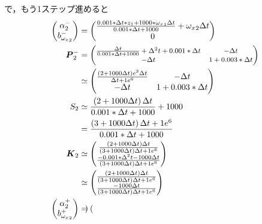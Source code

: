 で，もう1ステップ進めると
\begin{align}
  \begin{pmatrix}
    \alpha_{2}^{-}\\
    b_{{\omega_x}_{2}}^{-}
  \end{pmatrix} &=
  \begin{pmatrix}
    \frac{0.001 * \Delta t * z_{1} + 1000 * {\omega_x}_{1} \Delta t}{0.001 * \Delta t + 1000} + {\omega_x}_2 \Delta t\\
    0
  \end{pmatrix}\\
  \boldsymbol{P}_{2}^{-} &=
  {\footnotesize
    \begin{pmatrix}
      \frac{\Delta t}{0.001 * \Delta t + 1000} + \Delta^2 t + 0.001 * \Delta t & - \Delta t\\
      - \Delta t & 1 + 0.003 * \Delta t
    \end{pmatrix}}\\
  &\simeq
  \begin{pmatrix}
    \frac{\left(2 + 1000 \Delta t\right) e^{3} \Delta t}{\Delta t + 1e^{6}} & - \Delta t\\
    - \Delta t & 1 + 0.003 * \Delta t
  \end{pmatrix}\\
  S_{2} &\simeq \frac{\left(2 + 1000 \Delta t\right)\Delta t}{0.001 * \Delta t + 1000} + 1000\\
  &= \frac{\left(3 + 1000 \Delta t\right)\Delta t + 1e^{6}}{0.001 * \Delta t + 1000}\\
  \boldsymbol{K}_{2}
  &\simeq
  \begin{pmatrix}
    \frac{\left(2 + 1000 \Delta t\right)\Delta t}{\left(3 + 1000 \Delta t\right)\Delta t + 1e^{6}}\\
    \frac{-0.001 * \Delta^2 t - 1000 \Delta t}{\left(3 + 1000 \Delta t\right)\Delta t + 1e^{6}}
  \end{pmatrix}\\
  &\simeq
  \begin{pmatrix}
    \frac{\left(2 + 1000 \Delta t\right)\Delta t}{\left(3 + 1000 \Delta t\right)\Delta t + 1e^{6}}\\
    \frac{- 1000 \Delta t}{\left(3 + 1000 \Delta t\right)\Delta t + 1e^{6}}
  \end{pmatrix}\\
  \begin{pmatrix}
    \alpha_{2}^{+}\\
    b_{{\omega_x}_{2}}^{+}
  \end{pmatrix} &=
  \begin{pmatrix}

\end{pmatrix}
\end{align}

